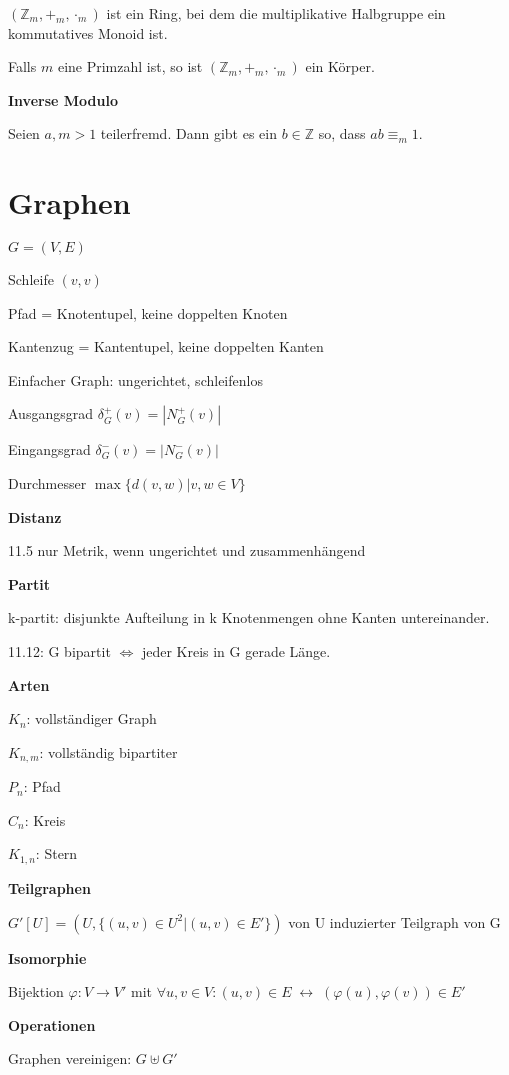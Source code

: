 \documentclass[a4paper,10pt]{article}
\newcommand{\integers}{\mathbb{Z}}
\begin{document}
\begin{multicols}{3}
$(\integers_m,+_m,\cdot_m)$ ist ein Ring, bei dem die multiplikative Halbgruppe ein kommutatives Monoid ist.

Falls $m$ eine Primzahl ist, so ist $(\integers_m,+_m,\cdot_m)$ ein Körper.

\textbf{Inverse Modulo}

Seien $a,m > 1$ teilerfremd. Dann gibt es ein $b \in \integers$ so, dass $ab \equiv_m 1$. 

\section{Graphen}

$G=(V,E)$

Schleife $(v,v)$

Pfad = Knotentupel, keine doppelten Knoten

Kantenzug = Kantentupel, keine doppelten Kanten

Einfacher Graph: ungerichtet, schleifenlos

Ausgangsgrad $\delta_G^+(v) = |N_G^+(v)|$

Eingangsgrad $\delta_G^-(v) = |N_G^-(v)|$

Durchmesser $\max \{d(v,w) | v,w \in V\}$

\textbf{Distanz}

11.5 nur Metrik, wenn ungerichtet und zusammenhängend

\textbf{Partit}

k-partit: disjunkte Aufteilung in k Knotenmengen ohne Kanten untereinander.

11.12: G bipartit $\iff$ jeder Kreis in G gerade Länge.

\textbf{Arten}

$K_n$: vollständiger Graph

$K_{n,m}$: vollständig bipartiter

$P_n$: Pfad

$C_n$: Kreis

$K_{1,n}$: Stern

\textbf{Teilgraphen}

$G'[U] = (U, \{(u,v) \in U^2 | (u,v) \in E'\})$ von U induzierter Teilgraph von G

\textbf{Isomorphie}

Bijektion $\varphi\colon V \rightarrow V'$ mit $\forall u,v \in V: (u,v) \in E \; \leftrightarrow \; (\varphi(u),\varphi(v)) \in E'$

\textbf{Operationen}

Graphen vereinigen: $G \uplus G'$ 


\end{multicols}
\end{document}
